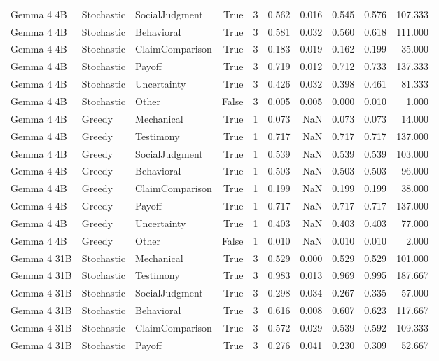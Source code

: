 \begin{tabular}{lllrrrrrrr}
Gemma 4 4B & Stochastic & SocialJudgment & True & 3 & 0.562 & 0.016 & 0.545 & 0.576 & 107.333 \\
Gemma 4 4B & Stochastic & Behavioral & True & 3 & 0.581 & 0.032 & 0.560 & 0.618 & 111.000 \\
Gemma 4 4B & Stochastic & ClaimComparison & True & 3 & 0.183 & 0.019 & 0.162 & 0.199 & 35.000 \\
Gemma 4 4B & Stochastic & Payoff & True & 3 & 0.719 & 0.012 & 0.712 & 0.733 & 137.333 \\
Gemma 4 4B & Stochastic & Uncertainty & True & 3 & 0.426 & 0.032 & 0.398 & 0.461 & 81.333 \\
Gemma 4 4B & Stochastic & Other & False & 3 & 0.005 & 0.005 & 0.000 & 0.010 & 1.000 \\
Gemma 4 4B & Greedy & Mechanical & True & 1 & 0.073 & NaN & 0.073 & 0.073 & 14.000 \\
Gemma 4 4B & Greedy & Testimony & True & 1 & 0.717 & NaN & 0.717 & 0.717 & 137.000 \\
Gemma 4 4B & Greedy & SocialJudgment & True & 1 & 0.539 & NaN & 0.539 & 0.539 & 103.000 \\
Gemma 4 4B & Greedy & Behavioral & True & 1 & 0.503 & NaN & 0.503 & 0.503 & 96.000 \\
Gemma 4 4B & Greedy & ClaimComparison & True & 1 & 0.199 & NaN & 0.199 & 0.199 & 38.000 \\
Gemma 4 4B & Greedy & Payoff & True & 1 & 0.717 & NaN & 0.717 & 0.717 & 137.000 \\
Gemma 4 4B & Greedy & Uncertainty & True & 1 & 0.403 & NaN & 0.403 & 0.403 & 77.000 \\
Gemma 4 4B & Greedy & Other & False & 1 & 0.010 & NaN & 0.010 & 0.010 & 2.000 \\
Gemma 4 31B & Stochastic & Mechanical & True & 3 & 0.529 & 0.000 & 0.529 & 0.529 & 101.000 \\
Gemma 4 31B & Stochastic & Testimony & True & 3 & 0.983 & 0.013 & 0.969 & 0.995 & 187.667 \\
Gemma 4 31B & Stochastic & SocialJudgment & True & 3 & 0.298 & 0.034 & 0.267 & 0.335 & 57.000 \\
Gemma 4 31B & Stochastic & Behavioral & True & 3 & 0.616 & 0.008 & 0.607 & 0.623 & 117.667 \\
Gemma 4 31B & Stochastic & ClaimComparison & True & 3 & 0.572 & 0.029 & 0.539 & 0.592 & 109.333 \\
Gemma 4 31B & Stochastic & Payoff & True & 3 & 0.276 & 0.041 & 0.230 & 0.309 & 52.667 \\

\end{tabular}
